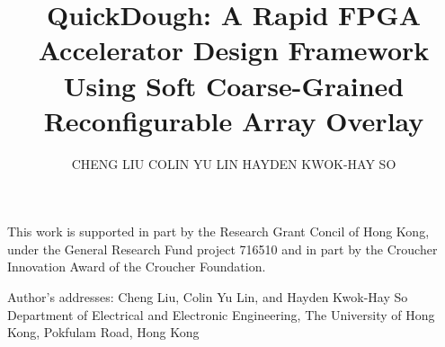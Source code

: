 \documentclass[acmtrets]{acmsmall}
\begin{document}

\title{QuickDough: A Rapid FPGA Accelerator Design Framework Using Soft Coarse-Grained Reconfigurable Array Overlay}
\author{CHENG LIU
COLIN YU LIN
HAYDEN KWOK-HAY SO
}

\begin{abstract}
    
\end{abstract}



\begin{bottomstuff}
This work is supported in part by the Research Grant Concil of Hong
Kong, under the General Research Fund project 716510 and in part by
the Croucher Innovation Award of the Croucher Foundation.

Author's addresses: Cheng Liu, Colin Yu Lin, and Hayden Kwok-Hay So
Department of Electrical and Electronic Engineering, The University of
Hong Kong, Pokfulam Road, Hong Kong

\end{bottomstuff}

\maketitle











{\small}
\end{document}
